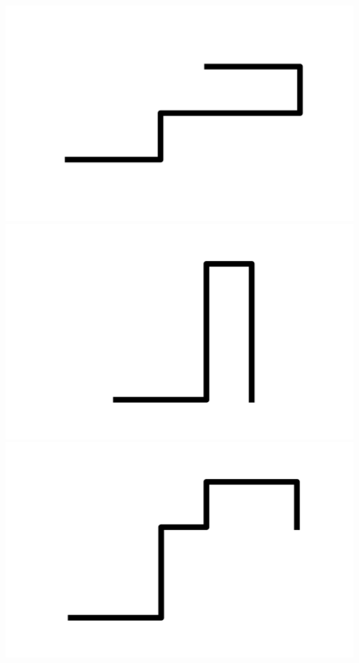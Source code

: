\documentclass[]{report}
\begin{document}
\includegraphics[scale=.1]{pictures/21/state_cluster_shapes_238.pdf} 
\includegraphics[scale=.1]{pictures/21/state_cluster_shapes_239.pdf} 
\includegraphics[scale=.1]{pictures/21/state_cluster_shapes_240.pdf} 
\end{document}
